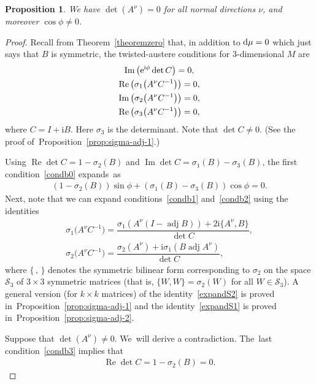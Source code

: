 \documentclass[pdftex]{sigma}
\def\ri{\mathrm{i}}
\renewcommand{\Im}{\operatorname{Im}}
\renewcommand{\Re}{\operatorname{Re}}
\def\adj{\operatorname{adj}}
\def\calS{\mathcal{S}}
\newtheorem{Proposition}[Theorem]{Proposition}
\numberwithin{equation}{section}
\begin{document}
\begin{Proposition} \label{thm1step1}
We have $\det (A^\nu) = 0$ for all normal directions $\nu$, and moreover $\cos \phi \ne 0$.
\end{Proposition}
\begin{proof}
Recall from Theorem~\ref{theoremzero} that, in addition to ${\rm d} \mu = 0$ which just says that $B$ is symmetric, the twisted-austere conditions for $3$-dimensional $M$ are
\begin{gather}
\Im \big({\rm e}^{\ri \phi} \det C\big) = 0, \label{condb0} \\
\Re \big(\sigma_1 \big(A^\nu C^{-1}\big) \big) = 0, \label{condb1} \\
\Im \big(\sigma_2 \big(A^\nu C^{-1}\big) \big) = 0, \label{condb2} \\
\Re \big(\sigma_3 \big(A^\nu C^{-1}\big) \big) = 0, \label{condb3}
\end{gather}
where $C = I + \ri B$. Here $\sigma_3$ is the determinant. Note that $\det C \neq 0$. (See the proof of~Pro\-position~\ref{prop:sigma-adj-1}.)

Using $\Re \det C = 1-\sigma_2(B)$ and $\Im \det C = \sigma_1(B) - \sigma_3(B)$, the first condition~\eqref{condb0} ex\-pands~as
\begin{gather} \label{expandet}
(1-\sigma_2(B)) \sin \phi + (\sigma_1(B) - \sigma_3(B))\cos\phi = 0.
\end{gather}
Next, note that we can expand conditions~\eqref{condb1} and~\eqref{condb2} using the identities
\begin{gather}
\sigma_1\big(A^\nu C^{-1}\big) = \dfrac{\sigma_1(A^\nu (I -\adj B)) + 2\ri \{A^\nu,B\}}{\det C}, \label{expandS1} \\
\sigma_2\big(A^\nu C^{-1}\big) = \dfrac{\sigma_2(A^\nu) + \ri \sigma_1( B \adj A^\nu) }{\det C}, \label{expandS2}
\end{gather}
where $\{\,,\,\}$ denotes the symmetric bilinear form corresponding to $\sigma_2$ on the space $\calS_3$ of $3 \times 3$ symmetric matrices (that is, $\{W,W\} = \sigma_2(W)$ for all $W \in \calS_3$). A general version (for $k \times k$ matrices) of the identity~\eqref{expandS2} is proved in~Proposition~\ref{prop:sigma-adj-1} and the identity~\eqref{expandS1} is proved in~Proposition~\ref{prop:sigma-adj-2}.

Suppose that $\det(A^\nu)\ne 0$. We~will derive a contradiction. The~last condition~\eqref{condb3} implies that
\begin{gather} \label{sigmab} \Re \det C = 1-\sigma_2(B) =0.\end{gather}


\end{proof}
\end{document}
